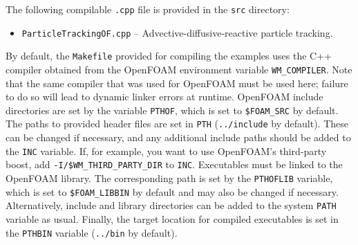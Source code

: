 \documentclass[11pt]{article}
\begin{document}
The following compilable \lstinline{.cpp} file is provided in the \lstinline{src} directory:
%
\begin{itemize}
\item \lstinline{ParticleTrackingOF.cpp} -- Advective-diffusive-reactive particle tracking.
\end{itemize}
By default, the \lstinline{Makefile} provided for compiling the examples uses the C++ compiler obtained from the OpenFOAM environment variable \lstinline{WM_COMPILER}. Note that the same compiler that was used for OpenFOAM must be used here; failure to do so will lead to dynamic linker errors at runtime. OpenFOAM include directories are set by the variable \lstinline{PTHOF}, which is set to \lstinline{$FOAM_SRC} by default. The paths to provided header files are set in \lstinline{PTH} (\lstinline{../include} by default). These can be changed if necessary, and any additional include paths should be added to the \lstinline{INC} variable. If, for example, you want to use OpenFOAM's third-party boost, add \lstinline{-I/$WM_THIRD_PARTY_DIR} to \lstinline{INC}. Executables must be linked to the OpenFOAM library. The corresponding path is set by the \lstinline{PTHOFLIB} variable, which is set to \lstinline{$FOAM_LIBBIN} by default and may also be changed if necessary. Alternatively, include and library directories can be added to the system \lstinline{PATH} variable as usual. Finally, the target location for compiled executables is set in the \lstinline{PTHBIN} variable (\lstinline{../bin} by default).
\end{document}
